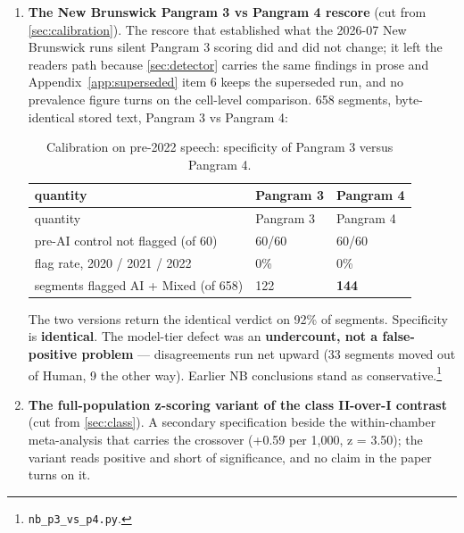 \begin{enumerate}
  \begin{quote}
  Chasing the occupational ordering produced a by-product worth naming: a measure of socioeconomic position scored from occupational content rather than from a categorical schema. Its distinctive level --- free work, outside the organisational hierarchy altogether --- carried a preregistered, confirmed prediction. The best-performing form is a folk category, concretized: machine coders, blind to the outcome, turned the everyday picture of a corporate ladder into a scored instrument. Bespoke classifications of that kind are now cheap enough to preregister and check.
  \end{quote}
\item
  \textbf{The New Brunswick Pangram 3 vs Pangram 4 rescore} (cut from \cref{sec:calibration}). The
  rescore that established what the 2026-07 New Brunswick run\textquotesingle s silent
  Pangram 3 scoring did and did not change; it left the reader\textquotesingle s path because
  \cref{sec:detector} carries the same findings in prose and Appendix~\ref{app:superseded} item 6 keeps the
  superseded run, and no prevalence figure turns on the cell-level
  comparison. 658 segments, byte-identical stored text, Pangram 3 vs Pangram
  4:

  \begingroup\small
\begin{longtable}[]{@{}lll@{}}
\caption{Calibration on pre-2022 speech: specificity of Pangram 3 versus Pangram 4.}\label{tab:calibration}\\
  \toprule\noalign{}
  quantity & Pangram 3 & Pangram 4 \\
  \midrule\noalign{}
\endfirsthead
  \toprule\noalign{}
  quantity & Pangram 3 & Pangram 4 \\
  \midrule\noalign{}
\endhead
  \bottomrule\noalign{}
  \endlastfoot
  pre-AI control not flagged (of 60) & 60/60 & 60/60 \\
  flag rate, 2020 / 2021 / 2022 & 0\% & 0\% \\
  segments flagged AI + Mixed (of 658) & 122 & \textbf{144} \\
  \end{longtable}
\endgroup

  The two versions return the identical verdict on 92\% of segments.
  Specificity is \textbf{identical}. The model-tier defect was an \textbf{undercount,
  not a false-positive problem} --- disagreements run net upward (33 segments
  moved out of Human, 9 the other way). Earlier NB conclusions stand as
  conservative.\footnote{\texttt{nb\_p3\_vs\_p4.py}.}
\item
  \textbf{The full-population z-scoring variant of the class II-over-I contrast}
  (cut from \cref{sec:class}). A secondary specification beside the within-chamber
  meta-analysis that carries the crossover (+0.59 per 1,000, z = 3.50); the
  variant reads positive and short of significance, and no claim in the paper
  turns on it.


\end{enumerate}
